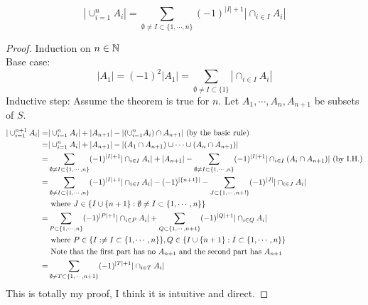 \begin{theorem}
    $$|\cup_{i=1}^nA_i|= \sum_{\emptyset \neq I \subset \{1,\cdots,n\}}(-1)^{|I|+1}|\cap_{i \in I}A_i|$$
\end{theorem}
\begin{proof}
    Induction on $n \in \mathbb{N}$\\
    Base case: $$|A_1|=(-1)^2|A_1|=\sum_{\emptyset \neq I \subset \{1\}}|\cap_{i \in I}A_i|$$
    Inductive step: Assume the theorem is true for $n$. Let $A_1,\cdots,A_n,A_{n+1}$ be subsets of $S$.
    \begin{equation}
        \begin{split}
            |\cup_{i=1}^{n+1}A_i| =& |\cup_{i=1}^nA_i|+|A_{n+1}|-|(\cup_{i=1}^nA_i)\cap A_{n+1}| \text{ (by the basic rule)}\\
            =& |\cup_{i=1}^nA_i|+|A_{n+1}| -|(A_1\cap A_{n+1})\cup \cdots \cup(A_n\cap A_{n+1})|\\
            =& \sum_{\emptyset \neq I \subset \{1,\cdots,n\}}(-1)^{|I|+1}|\cap_{i \in I}A_i| + |A_{n+1}|- \sum_{\emptyset \neq I \subset \{1,\cdots,n\}}(-1)^{|I|+1}|\cap_{i \in I}(A_i \cap A_{n+1})| \text{ (by I.H.)}\\
            =& \sum_{\emptyset \neq I \subset \{1,\cdots,n\}}(-1)^{|I|+1}|\cap_{i \in I}A_i| - (-1)^{|\{n+1\}|} -\sum_{J \subset \{1,\cdots,n+!\}}(-1)^{|J|}|\cap_{i \in J}A_i|\\
            & \text{ where } J \in \{I \cup \{n+1\}: \emptyset \neq I \subset \{1,\cdots,n\}\}\\
            =& \sum_{P \subset \{1,\cdots,n\}}(-1)^{|P|+1}|\cap_{i \in P}A_i| + \sum_{Q \subset \{1,\cdots,n+1\}}(-1)^{|Q|+1}|\cap_{i \in Q}A_i|\\
            & \text{ where } P \in \{I: \empty \neq I \subset \{1,\cdots,n\}\}, Q \in \{I\cup \{n+1\}: I \subset \{1,\cdots,n\}\}\\
            & \text{ Note that the first part has no $A_{n+1}$ and the second part has $A_{n+1}$}\\
            =& \sum_{\emptyset \neq T \subset \{1,\cdots,n+1\}}(-1)^{|T|+1}|\cap_{i \in T}A_i|
        \end{split}
    \end{equation}
    This is totally my proof, I think it is intuitive and direct.
\end{proof}

